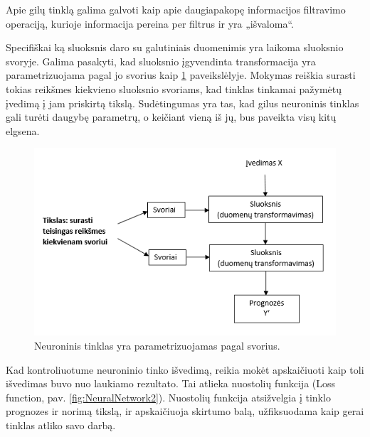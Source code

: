 \documentclass{VUMIFInfKursinis}
\begin{document}
Apie gilų tinklą galima galvoti kaip apie daugiapakopę informacijos filtravimo operaciją, kurioje informacija pereina per filtrus ir yra „išvaloma“.

Specifiškai ką sluoksnis daro su galutiniais duomenimis yra laikoma sluoksnio svoryje. Galima pasakyti, kad sluoksnio įgyvendinta transformacija yra parametrizuojama pagal jo svorius kaip \ref{fig:NeuralNetwork} paveikslėlyje. Mokymas reiškia surasti tokias reikšmes kiekvieno sluoksnio svoriams, kad tinklas tinkamai pažymėtų įvedimą į jam priskirtą tikslą. Sudėtingumas yra tas, kad gilus neuroninis tinklas gali turėti daugybę parametrų, o keičiant vieną iš jų, bus paveikta visų kitų elgsena.

\begin{figure}[h!]
\centering
  \includegraphics[scale=0.9]{img/figure_1-7}
  \caption{Neuroninis tinklas yra parametrizuojamas pagal svorius.}
  \label{fig:NeuralNetwork}
\end{figure}

\newpage

Kad kontroliuotume neuroninio tinko išvedimą, reikia mokėt apskaičiuoti kaip toli išvedimas buvo nuo laukiamo rezultato. Tai atlieka nuostolių funkcija (Loss function, pav. \ref{fig:NeuralNetwork2}). Nuostolių funkcija atsižvelgia į tinklo prognozes ir norimą tikslą, ir apskaičiuoja skirtumo balą, užfiksuodama kaip gerai tinklas atliko savo darbą.
\end{document}
